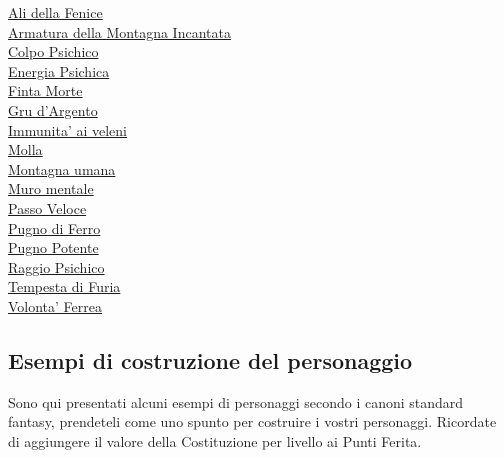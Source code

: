 \begin{multicols}{3}
{\begin{flushleft}
\hyperlink{Ali della Fenice}{Ali della Fenice}\\
\hyperlink{Armatura della Montagna Incantata}{Armatura della Montagna Incantata}\\
\hyperlink{Colpo Psichico}{Colpo Psichico}\\
\hyperlink{Energia Psichica}{Energia Psichica}\\
\hyperlink{Finta Morte}{Finta Morte}\\
\hyperlink{Gru d'Argento}{Gru d'Argento}\\
\hyperlink{Immunita' ai veleni}{Immunita' ai veleni}\\
\hyperlink{Molla}{Molla}\\
\hyperlink{Montagna umana}{Montagna umana}\\
\hyperlink{Muro mentale}{Muro mentale}\\
\hyperlink{abPasso Veloce}{Passo Veloce}\\
\hyperlink{Pugno di Ferro}{Pugno di Ferro}\\
\hyperlink{Pugno Potente}{Pugno Potente}\\
\hyperlink{Raggio Psichico}{Raggio Psichico}\\
\hyperlink{Tempesta di Furia}{Tempesta di Furia}\\
\hyperlink{Volonta' Ferrea}{Volonta' Ferrea}

\end{flushleft}
}

\end{multicols}

\subsection{Esempi di costruzione del personaggio}

Sono qui presentati alcuni esempi di personaggi secondo i canoni standard fantasy, prendeteli come uno spunto per costruire i vostri personaggi. Ricordate di aggiungere il valore della Costituzione per livello ai Punti Ferita.

